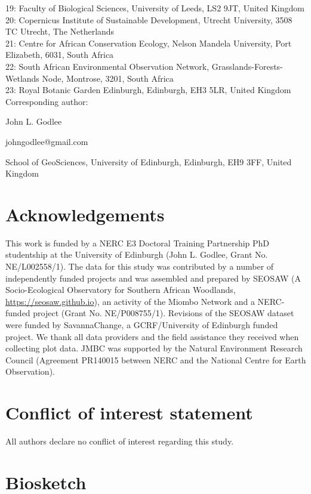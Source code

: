 \documentclass[11pt,a4paper]{article}
\begin{document}
19: Faculty of Biological Sciences, University of Leeds, LS2 9JT, United Kingdom\\
20: Copernicus Institute of Sustainable Development, Utrecht University, 3508 TC Utrecht, The Netherlands \\
21: Centre for African Conservation Ecology, Nelson Mandela University, Port Elizabeth, 6031, South Africa \\
22: South African Environmental Observation Network, Grasslands-Forests-Wetlands Node, Montrose, 3201, South Africa \\
23: Royal Botanic Garden Edinburgh, Edinburgh, EH3 5LR, United Kingdom \\

\vspace{1em}
Corresponding author:

John L. Godlee

johngodlee@gmail.com

School of GeoSciences, University of Edinburgh, Edinburgh, EH9 3FF, United Kingdom

\section{Acknowledgements}

This work is funded by a NERC E3 Doctoral Training Partnership PhD studentship at the University of Edinburgh (John L. Godlee, Grant No. NE/L002558/1). The data for this study was contributed by a number of independently funded projects and was assembled and prepared by SEOSAW (A Socio-Ecological Observatory for Southern African Woodlands, \url{https://seosaw.github.io}), an activity of the Miombo Network and a NERC-funded project (Grant No. NE/P008755/1). Revisions of the SEOSAW dataset were funded by SavannaChange, a GCRF/University of Edinburgh funded project. We thank all data providers and the field assistance they received when collecting plot data. JMBC was supported by the Natural Environment Research Council (Agreement PR140015 between NERC and the National Centre for Earth Observation). 

\section{Conflict of interest statement}

All authors declare no conflict of interest regarding this study.

\section{Biosketch}
\end{document}
